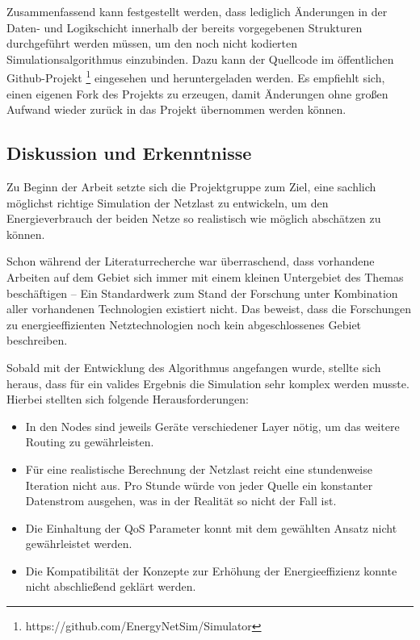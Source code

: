 Zusammenfassend kann festgestellt werden, dass lediglich Änderungen in der Daten- und Logikschicht innerhalb der bereits vorgegebenen Strukturen durchgeführt werden müssen, um den noch nicht kodierten Simulationsalgorithmus einzubinden. Dazu kann der Quellcode im öffentlichen Github-Projekt \footnote{https://github.com/EnergyNetSim/Simulator} eingesehen und heruntergeladen werden. Es empfiehlt sich, einen eigenen Fork des Projekts zu erzeugen, damit Änderungen ohne großen Aufwand wieder zurück in das Projekt übernommen werden können.


\subsection{Diskussion und Erkenntnisse} \label{subsec:ErgDiskussion}

Zu Beginn der Arbeit setzte sich die Projektgruppe zum Ziel, eine sachlich möglichst richtige Simulation der Netzlast zu entwickeln, um den Energieverbrauch der beiden Netze so realistisch wie möglich abschätzen zu können. 

Schon während der Literaturrecherche war überraschend, dass vorhandene Arbeiten auf dem Gebiet sich immer mit einem kleinen Untergebiet des Themas beschäftigen -- Ein Standardwerk zum Stand der Forschung unter Kombination aller vorhandenen Technologien existiert nicht. Das beweist, dass die Forschungen zu energieeffizienten Netztechnologien noch kein abgeschlossenes Gebiet beschreiben.

Sobald mit der Entwicklung des Algorithmus angefangen wurde, stellte sich heraus, dass für ein valides Ergebnis die Simulation sehr komplex werden musste. Hierbei stellten sich folgende Herausforderungen:
\begin{itemize}
	\item In den Nodes sind jeweils Geräte verschiedener Layer nötig, um das weitere Routing zu gewährleisten. 
	\item Für eine realistische Berechnung der Netzlast reicht eine stundenweise Iteration nicht aus. Pro Stunde würde von jeder Quelle ein konstanter Datenstrom ausgehen, was in der Realität so nicht der Fall ist.
	\item Die Einhaltung der QoS Parameter konnt mit dem gewählten Ansatz nicht ge\-währ\-lei\-stet werden.
	\item Die Kompatibilität der Konzepte zur Erhöhung der Energieeffizienz konnte nicht abschließend geklärt werden.
\end{itemize}

